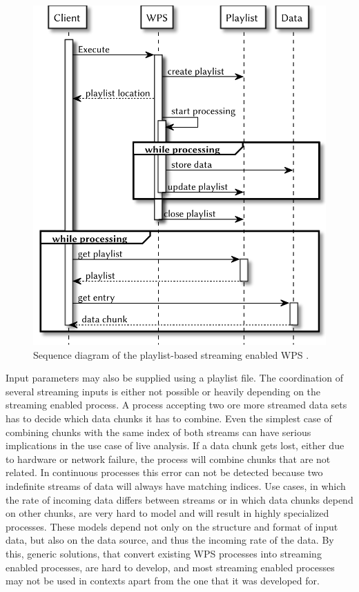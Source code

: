   \begin{figure}[!htb]
    \centering
    \includegraphics[width=0.54225352112676062\linewidth]{figures/sequence-diagramm-previous.pdf}
    \caption{\label{fig:sd:previous}Sequence diagram of the playlist-based streaming enabled WPS \citep{foerster2012live}.}
  \end{figure}

  Input parameters may also be supplied using a playlist file. The coordination of several streaming inputs is either not possible or heavily depending on the streaming enabled process. A process accepting two ore more streamed data sets has to decide which data chunks it has to combine. Even the simplest case of combining chunks with the same index of both streams can have serious implications in the use case of live analysis. If a data chunk gets lost, either due to hardware or network failure, the process will combine chunks that are not related. In continuous processes this error can not be detected because two indefinite streams of data will always have matching indices. Use cases, in which the rate of incoming data differs between streams or in which data chunks depend on other chunks, are very hard to model and will result in highly specialized processes. These models depend not only on the structure and format of input data, but also on the data source, and thus the incoming rate of the data. By this, generic solutions, that convert existing \ac{WPS} processes into streaming enabled processes, are hard to develop, and most streaming enabled processes may not be used in contexts apart from the one that it was developed for.

